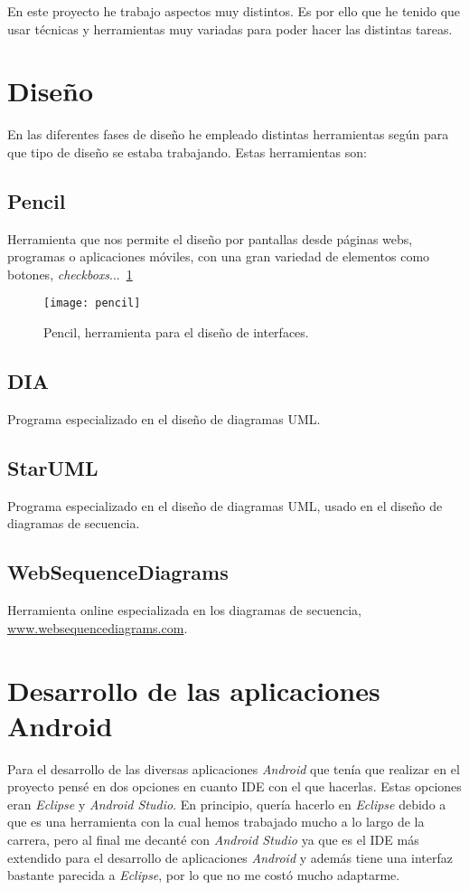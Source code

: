 
En este proyecto he trabajo aspectos muy distintos. Es por ello que he tenido que usar técnicas y herramientas muy variadas para poder hacer las distintas tareas.

\section{Diseño}
En las diferentes fases de diseño he empleado distintas herramientas según para que tipo de diseño se estaba trabajando. Estas herramientas son:
\subsection{Pencil}
Herramienta que nos permite el diseño por pantallas desde páginas webs, programas o aplicaciones móviles, con una gran variedad de elementos como botones, \textit{checkboxs}...~\ref{fig:pencil}

\begin{figure}
	\centering
	\texttt{[image: pencil]}
	\caption{Pencil, herramienta para el diseño de interfaces.}
	\label{fig:pencil}
\end{figure}
\subsection{DIA}Programa especializado en el diseño de diagramas UML.
\subsection{StarUML}Programa especializado en el diseño de diagramas UML, usado en el diseño de diagramas de secuencia.
\subsection{WebSequenceDiagrams}Herramienta online especializada en los diagramas de secuencia, \url{www.websequencediagrams.com}. 
\section{Desarrollo de las aplicaciones Android}
Para el desarrollo de las diversas aplicaciones \textit{Android} que tenía que realizar en el proyecto pensé en dos opciones en cuanto IDE con el que hacerlas. Estas opciones eran \textit{Eclipse} y \textit{Android Studio}. En principio, quería hacerlo en \textit{Eclipse} debido a que es una herramienta con la cual hemos trabajado mucho a lo largo de la carrera, pero al final me decanté con \textit{Android Studio} ya que es el IDE más extendido para el desarrollo de aplicaciones \textit{Android} y además tiene una interfaz bastante parecida a \textit{Eclipse}, por lo que no me costó mucho adaptarme.
